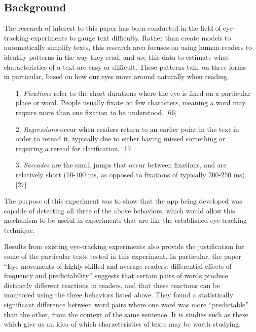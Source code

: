 \documentclass[11pt,letterpaper]{article}
\begin{document}
	\subsection{Background}
	
	The research of interest to this paper has been conducted in the field of eye-tracking experiments to gauge text difficulty. Rather than create models to automatically simplify texts, this research area focuses on using human readers to identify patterns in the way they read, and use this data to estimate what characteristics of a text are easy or difficult. These patterns take on three forms in particular, based on how our eyes move around naturally when reading.
	
	
	\begin{itemize}[noitemsep]
		\item[1.] \textit{Fixations} refer to the short durations where the eye is fixed on a particular place or word. People usually fixate on few characters, meaning a word may require more than one fixation to be understood. [66]
		\item[2.] \textit{Regressions} occur when readers return to an earlier point in the text in order to reread it, typically due to either having missed something or requiring a reread for clarification. [17]
		\item[3.] \textit{Saccades} are the small jumps that occur between fixations, and are relatively short (10-100 ms, as opposed to fixations of typically 200-250 ms). [27]
	\end{itemize}
	
	The purpose of this experiment was to show that the app being developed was capable of detecting all three of the above behaviors, which would allow this mechanism to be useful in experiments that are like the established eye-tracking technique.
	
	Results from existing eye-tracking experiments also provide the justification for some of the particular texts tested in this experiment. In particular, the paper ``Eye movements of highly skilled and average readers: differential effects of frequency and predictability'' suggests that certain pairs of words produce distinctly different reactions in readers, and that these reactions can be monitored using the three behaviors listed above. They found a statistically significant difference between word pairs where one word was more ``predictable'' than the other, from the context of the same sentence. It is studies such as these which give us an idea of which characteristics of texts may be worth studying.
	
\end{document}
